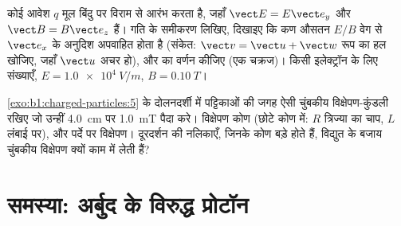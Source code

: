 \begin{exercise}[$\star\star\star$]\label{exo:b1:charged-particles:11}
कोई आवेश $q$ मूल बिंदु पर विराम से आरंभ करता है, जहाँ $\vect E = E\vect e_y$
और $\vect B = B\vect e_z$ हैं। गति के समीकरण लिखिए, दिखाइए कि कण औसतन
$E/B$ वेग से $\vect e_x$ के अनुदिश अपवाहित होता है
(संकेत: $\vect v = \vect u + \vect w$ रूप का हल खोजिए, जहाँ
$\vect u$ अचर हो), और  का वर्णन कीजिए (एक चक्रज)। किसी इलेक्ट्रॉन के
लिए संख्याएँ, $E = \qty{1.0e4}{V/m}$, $B = \qty{0.10}{T}$।
\end{exercise}

\begin{exercise}[$\star\star\star$]\label{exo:b1:charged-particles:12}
\cref{exo:b1:charged-particles:5} के दोलनदर्शी में पट्टिकाओं की जगह ऐसी
चुंबकीय विक्षेपण-कुंडली रखिए जो उन्हीं \qty{4.0}{cm} पर \qty{1.0}{mT} पैदा
करे। विक्षेपण कोण (छोटे कोण में: $R$ त्रिज्या का चाप, $L$ लंबाई पर), और
पर्दे पर विक्षेपण। दूरदर्शन की नलिकाएँ, जिनके कोण बड़े होते हैं, विद्युत के
बजाय चुंबकीय विक्षेपण क्यों काम में लेती हैं?
\end{exercise}

\section{समस्या: अर्बुद के विरुद्ध प्रोटॉन}

